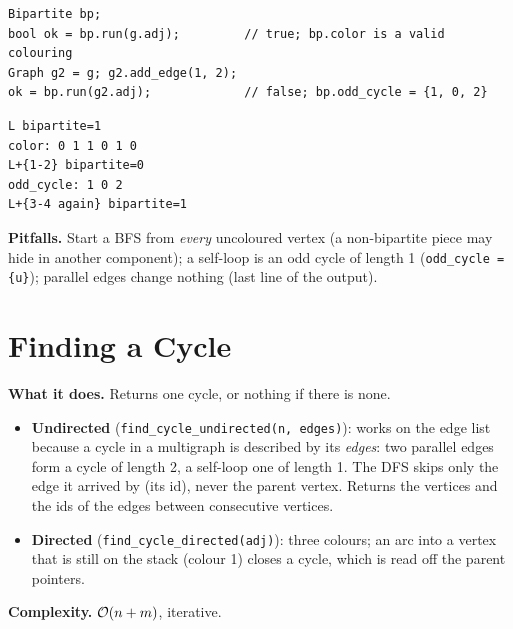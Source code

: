 \begin{lstlisting}[style=snippet]
Bipartite bp;
bool ok = bp.run(g.adj);         // true; bp.color is a valid colouring
Graph g2 = g; g2.add_edge(1, 2);
ok = bp.run(g2.adj);             // false; bp.odd_cycle = {1, 0, 2}
\end{lstlisting}
\begin{lstlisting}[style=trace]
L bipartite=1
color: 0 1 1 0 1 0
L+{1-2} bipartite=0
odd_cycle: 1 0 2
L+{3-4 again} bipartite=1
\end{lstlisting}

\textbf{Pitfalls.} Start a BFS from \emph{every} uncoloured vertex (a non-bipartite piece may hide in another component); a self-loop is an odd cycle of length 1 (\texttt{odd\_cycle = \{u\}}); parallel edges change nothing (last line of the output).



\clneed
\section{Finding a Cycle}
\label{sec:cl-cycle}

\textbf{What it does.} Returns one cycle, or nothing if there is none.
\begin{itemize}[leftmargin=*]
    \item \textbf{Undirected} (\texttt{find\_cycle\_undirected(n, edges)}): works on the edge list because a cycle in a multigraph is described by its \emph{edges}: two parallel edges form a cycle of length 2, a self-loop one of length 1. The DFS skips only the edge it arrived by (its id), never the parent vertex. Returns the vertices and the ids of the edges between consecutive vertices.
    \item \textbf{Directed} (\texttt{find\_cycle\_directed(adj)}): three colours; an arc into a vertex that is still on the stack (colour 1) closes a cycle, which is read off the parent pointers.
\end{itemize}

\textbf{Complexity.} $\mathcal{O}(n+m)$, iterative.

